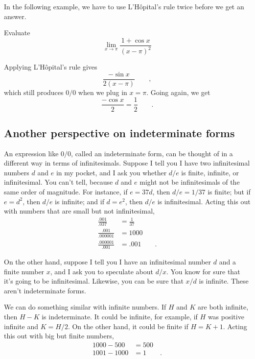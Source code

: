 In the following example, we have to use L'H\^{o}pital's rule twice before we get an answer.

\begin{eg}
\egquestion Evaluate
\begin{equation*}
  \lim_{x\rightarrow \pi} \frac{1+\cos x}{(x-\pi)^2}
\end{equation*}

\eganswer Applying  L'H\^{o}pital's rule gives
\begin{equation*}
  \frac{-\sin x}{2(x-\pi)} \qquad ,
\end{equation*}
which still produces $0/0$ when we plug in $x=\pi$. Going again, we get
\begin{equation*}
  \frac{-\cos x}{2} = \frac{1}{2} \qquad .
\end{equation*}
\end{eg}

\subsection{Another perspective on indeterminate forms}

An expression like $0/0$, called an indeterminate form,
can be thought of in a different way in terms of
infinitesimals. Suppose I tell you I have two infinitesimal numbers $d$ and $e$ in my
pocket, and I ask you whether $d/e$ is finite, infinite, or infinitesimal.
You can't tell, because $d$ and $e$ might not be infinitesimals of the same order of
magnitude. For instance, if $e=37d$, then $d/e=1/37$ is finite; but if
$e=d^2$, then $d/e$ is infinite; and if $d=e^2$, then $d/e$ is infinitesimal.
Acting this out with numbers that are small but not infinitesimal,
\begin{align*}
  \frac{.001}{.037} &= \frac{1}{37} \\
  \frac{.001}{.000001} &= 1000 \\
  \frac{.000001}{.001} &= .001 \qquad.
\end{align*}

On the other hand, suppose I tell you I have an infinitesimal number $d$ and a
finite number $x$, and I ask you to speculate about $d/x$. You know for sure
that it's going to be infinitesimal. Likewise, you can be sure that $x/d$ is
infinite. These aren't indeterminate forms.

We can do something similar with infinite numbers. If $H$ and $K$ are both
infinite, then $H-K$ is indeterminate. It could be infinite, for example, if
$H$ was positive infinite and $K=H/2$. On the other hand, it could be finite
if $H=K+1$. Acting this out with big but finite numbers,
\begin{align*}
  1000-500 &= 500 \\
  1001-1000 &= 1 \qquad .
\end{align*}

